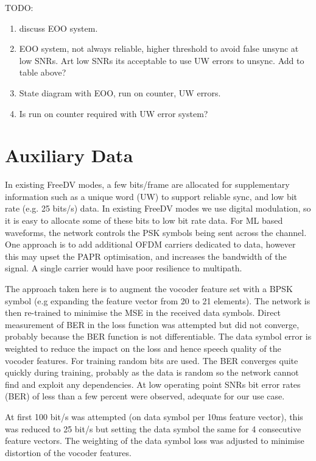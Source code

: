 \documentclass{article}
\begin{document}
TODO:
\begin{enumerate}
\item discuss EOO system.
\item EOO system, not always reliable, higher threshold to avoid false unsync at low SNRs.  Art low SNRs its acceptable to use UW errors to unsync. Add to table above?
\item State diagram with EOO, run on counter, UW errors. 
\item Is run on counter required with UW error system?
\end{enumerate}

\section{Auxiliary Data}

In existing FreeDV modes, a few bits/frame are allocated for supplementary information such as a unique word (UW) to support reliable sync, and low bit rate (e.g. 25 bits/s) data.  In existing FreeDV modes we use digital modulation, so it is easy to allocate some of these bits to low bit rate data.  For ML based waveforms, the network controls the PSK symbols being sent across the channel. One approach is to add additional OFDM carriers dedicated to data, however this may upset the PAPR optimisation, and increases the bandwidth of the signal.  A single carrier would have poor resilience to multipath.

The approach taken here is to augment the vocoder feature set with a BPSK symbol (e.g expanding the feature vector from 20 to 21 elements).  The network is then re-trained to minimise the MSE in the received data symbols.  Direct measurement of BER in the loss function was attempted but did not converge, probably because the BER function is not differentiable. The data symbol error is weighted to reduce the impact on the loss and hence speech quality of the vocoder features.  For training random bits are used.  The BER converges quite quickly during training, probably as the data is random so the network cannot find and exploit any dependencies.  At low operating point SNRs bit error rates (BER) of less than a few percent were observed, adequate for our use case.

At first 100 bit/s was attempted (on data symbol per 10ms feature vector), this was reduced to 25 bit/s but setting the data symbol the same for 4 consecutive feature vectors.  The weighting of the data symbol loss was adjusted to minimise distortion of the vocoder features.
\end{document}
